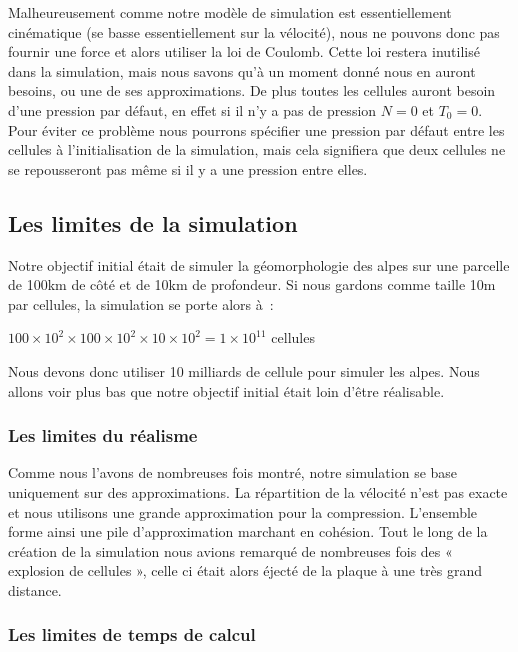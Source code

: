 \documentclass[a4paper,11pt]{article}
\begin{document}
Malheureusement comme notre modèle de simulation est essentiellement cinématique (se basse essentiellement sur la vélocité), nous ne pouvons donc pas fournir une force et alors utiliser la loi de Coulomb.
Cette loi restera inutilisé dans la simulation, mais nous savons qu'à un moment donné nous en auront besoins, ou une de ses approximations.
De plus toutes les cellules auront besoin d'une pression par défaut, en effet si il n'y a pas de pression $N = 0$ et $T_0 = 0$.
Pour éviter ce problème nous pourrons spécifier une pression par défaut entre les cellules à l'initialisation de la simulation, mais cela signifiera que deux cellules ne se repousseront pas même si il y a une pression entre elles. 

\subsection{Les limites de la simulation}

Notre objectif initial était de simuler la géomorphologie des alpes sur une parcelle de 100km de côté et de 10km de profondeur.
Si nous gardons comme taille 10m par cellules, la simulation se porte alors à~:
\begin{center}
  $100 \times 10^2 \times 100 \times 10^2 \times 10 \times 10^2 = 1 \times 10^{11}$ cellules
\end{center}
Nous devons donc utiliser 10 milliards de cellule pour simuler les alpes.
Nous allons voir plus bas que notre objectif initial était loin d'être réalisable.

\subsubsection{Les limites du réalisme}

Comme nous l'avons de nombreuses fois montré, notre simulation se base uniquement sur des approximations.
La répartition de la vélocité n'est pas exacte et nous utilisons une grande approximation pour la compression.
L'ensemble forme ainsi une pile d'approximation marchant en cohésion.
Tout le long de la création de la simulation nous avions remarqué de nombreuses fois des « explosion de cellules », celle ci était alors éjecté de la plaque à une très grand distance.

\subsubsection{Les limites de temps de calcul}

\begin{center}
\end{center}
\end{document}
